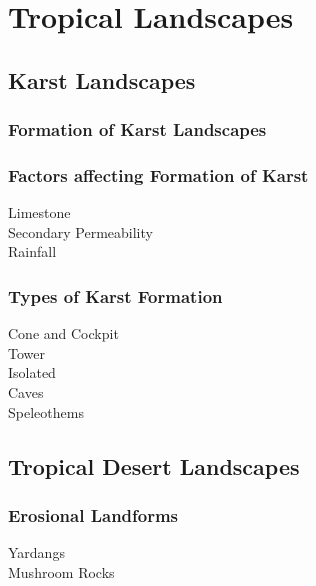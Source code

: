 \documentclass[../../main]{subfiles}
\begin{document}
\section{Tropical Landscapes}

\subsection{Karst Landscapes}

	\subsubsection{Formation of Karst Landscapes}

	\subsubsection{Factors affecting Formation of Karst}

	\begin{description}
		\item[Limestone]
		\item[Secondary Permeability]
		\item[Rainfall]
	\end{description}

	\subsubsection{Types of Karst Formation}

	\begin{description}
		\item[Cone and Cockpit]
		\item[Tower]
		\item[Isolated]
		\item[Caves]
		\item[Speleothems]
	\end{description}


\subsection{Tropical Desert Landscapes}

	\subsubsection{Erosional Landforms}

	\begin{description}
		\item[Yardangs]
		\item[Mushroom Rocks]
	\end{description}
\end{document}
